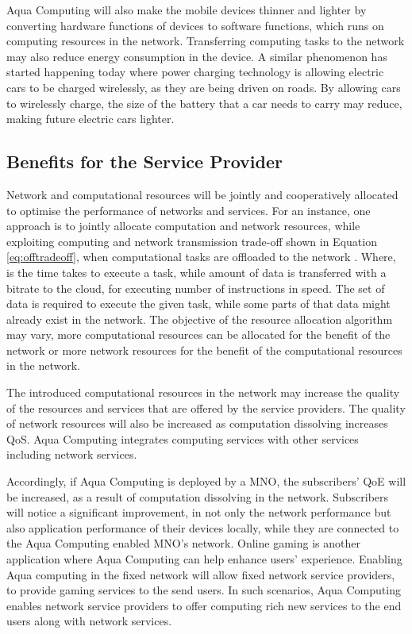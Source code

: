 \documentclass[12pt,journal,compsoc, onecolumn]{IEEEtran}
\begin{document}
Aqua Computing will also make the mobile devices thinner and lighter by converting hardware functions of devices to software functions, which runs on computing resources in the network. Transferring computing tasks to the network may also reduce energy consumption in the device. A similar phenomenon has started happening today where power charging technology is allowing electric cars to be charged wirelessly, as they are being driven on roads. By allowing cars to wirelessly charge, the size of the battery that a car needs to carry may reduce, making future electric cars lighter.

\subsection{Benefits for the Service Provider}

Network and computational resources will be jointly and cooperatively allocated to optimise the performance of networks and services. For an instance, one approach is to jointly allocate computation and network resources, while exploiting computing and network transmission trade-off shown in Equation \ref{eq:offtradeoff}, when computational tasks are offloaded to the network \cite{5445167} . Where,  is the time takes to execute a task, while  amount of data is transferred with a  bitrate to the cloud, for executing  number of instructions in  speed. The set of data  is required to execute the given task, while some parts of that data  might already exist in the network. The objective of the resource allocation algorithm may vary, more computational resources  can be allocated for the benefit of the network or more network resources  for the benefit of the computational resources in the network.



The introduced computational resources in the network may increase the quality of the resources and services that are offered by the service providers. The quality of network resources will also be increased as computation dissolving increases QoS. Aqua Computing integrates computing services with other services including network services.

Accordingly, if Aqua Computing is deployed by a MNO, the subscribers' QoE will be increased, as a result of computation dissolving in the network. Subscribers will notice a significant improvement, in not only the network performance but also application performance of their devices locally, while they are connected to the Aqua Computing enabled MNO's network. Online gaming is another application where Aqua Computing can help enhance users' experience. Enabling Aqua computing in the fixed network will allow fixed network service providers, to provide gaming services to the send users. In such scenarios, Aqua Computing enables network service providers to offer computing rich new services to the end users along with network services.
\end{document}
